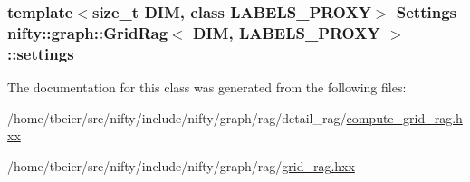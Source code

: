 \subsubsection[{settings\+\_\+}]{\setlength{\rightskip}{0pt plus 5cm}template$<$size\+\_\+t D\+I\+M, class L\+A\+B\+E\+L\+S\+\_\+\+P\+R\+O\+X\+Y$>$ {\bf Settings} {\bf nifty\+::graph\+::\+Grid\+Rag}$<$ D\+I\+M, L\+A\+B\+E\+L\+S\+\_\+\+P\+R\+O\+X\+Y $>$\+::settings\+\_\+\hspace{0.3cm}{\ttfamily [protected]}}\label{classnifty_1_1graph_1_1GridRag_af18452ee8060f7bb0fa527da6c2fc3a5}


The documentation for this class was generated from the following files\+:\begin{DoxyCompactItemize}
\item 
/home/tbeier/src/nifty/include/nifty/graph/rag/detail\+\_\+rag/\hyperlink{compute__grid__rag_8hxx}{compute\+\_\+grid\+\_\+rag.\+hxx}\item 
/home/tbeier/src/nifty/include/nifty/graph/rag/\hyperlink{grid__rag_8hxx}{grid\+\_\+rag.\+hxx}\end{DoxyCompactItemize}
